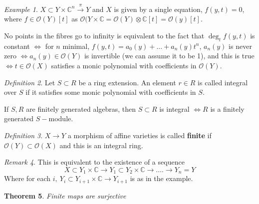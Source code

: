 \documentclass[12pt]{article}
\newtheorem{theorem}{Theorem}[section]
\theoremstyle{remark}
\newtheorem{remark}[theorem]{Remark}
\newtheorem{definition}[theorem]{Definition}
\newtheorem{example}[theorem]{Example}
\newcommand{\C}{\mathbb{C}}
\begin{document}
\begin{example}
$X \subset Y \times \C^n \xrightarrow{\pi} Y$ and $X$ is given by a single equation, $f(y,t) = 0$, where $f \in \mathcal{O}(Y)[t]$ as $\mathcal{O}(Y \times \C = \mathcal{O}(Y) \otimes \C[t] = \mathcal{O}(y)[t]$.
\end{example}

No points in the fibres go to infinity is equivalent to the fact that $\deg_t f(y,t)$ is constant $\iff$ for $n$ minimal, $f(y,t) = a_0(y)+...+a_n(y) t^n$, $a_n(y)$ is never zero $\iff a_n(y) \in \mathcal{O}(Y)$ is invertible (we can assume it to be 1), and this is true $\iff t \in \mathcal{O}(X)$ satisfies a monic polynomial with coefficients in $\mathcal{O}(Y)$.

\begin{definition}
Let $S \subset R$ be a ring extension. An element $r \in R$ is called integral over $S$ if it satisfies some monic polynomial with coefficients in $S$.
\end{definition}

If $S,R$ are finitely generated algebras, then $S \subset R$ is integral $\iff R$ is a finitely generated $S-$module. 

\begin{definition}
$X \rightarrow Y$ a morphism of affine varieties is called \textbf{finite} if $\mathcal{O}(Y) \subset \mathcal{O}(X)$ and this is an integral ring.
\end{definition}

\begin{remark}
This is equivalent to the existence of a sequence 
$$X \subset Y_1 \times \C \rightarrow Y_1 \subset Y_2 \times \C \rightarrow .... \rightarrow Y_n = Y $$
Where for each $i, \ Y_i \subset Y_{i+1} \times \C \rightarrow Y_{i+1}$ is as in the example.
\end{remark}

\begin{theorem}
Finite maps are surjective
\end{theorem}
\end{document}
